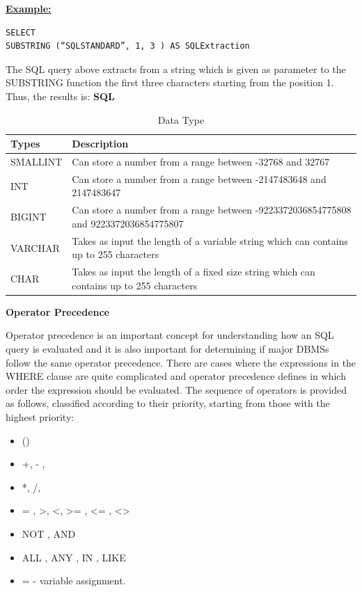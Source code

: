 \hfill\newpage
\noindent\textbf{\underline{Example:}}
\begin{mdframed}[backgroundcolor=lightgray!20] 
\begin{lstlisting}[style=SQL]
SELECT 
SUBSTRING (“SQLSTANDARD”, 1, 3 ) AS SQLExtraction 
\end{lstlisting}
\end{mdframed}

The SQL query above extracts from a string which is given as parameter to the SUBSTRING function the first three characters starting from the position 1. Thus, the results is: \textbf{SQL}

\begin{table}[h]
\centering
\caption{Data Type}
\begin{tabular}{|p{2.5cm}|p{11.5cm}| }
\hline
\textbf{Types} & \textbf{Description}                                                                     \\ \hline
SMALLINT       & Can store a number from a range between -32768 and 32767                                 \\ \hline
INT            & Can store a number from a range between -2147483648 and 2147483647                       \\ \hline
BIGINT         & Can store a number from a range between -9223372036854775808 and 9223372036854775807     \\ \hline
VARCHAR        & Takes as input the length of a variable string which can contains up to 255 characters   \\ \hline
CHAR           & Takes as input the length of a fixed size string which can contains up to 255 characters \\ \hline
\end{tabular}
\end{table}

\textbf{Operator Precedence}

Operator precedence is an important concept for understanding how an SQL query is evaluated and it is also important for determining if major DBMSs follow the same operator precedence. There are cases where the expressions in the WHERE clause are quite complicated and operator precedence defines in which order the expression should be evaluated. The sequence of operators is provided as follows, classified according to their priority, starting from those with the highest priority: 

\begin{itemize}
\item  () 
\item  +, - , ~
\item  *, /, %
\item  = , \textgreater , \textless , \textgreater= ,  \textless= ,  \textless\textgreater
\item  NOT ,  AND
\item  ALL , ANY , IN , LIKE
\item  = - variable assignment. 
\end{itemize}

